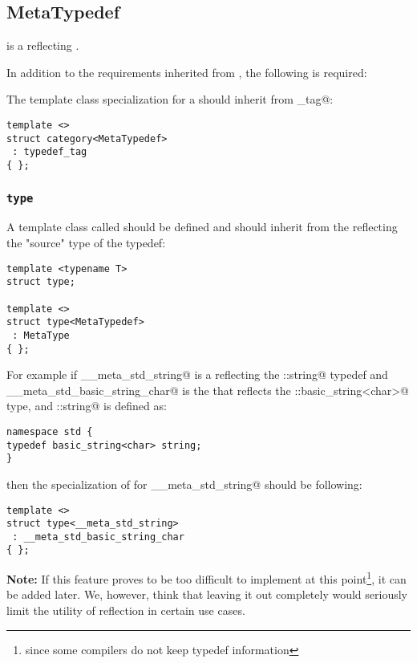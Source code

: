 \subsection{MetaTypedef}
\label{concept-MetaTypedef}

 is a  reflecting \verb@typedef@s.

In addition to the requirements inherited from , the following is required:

The \verb@category@ template class specialization for a  should
inherit from \verb@typedef_tag@:

\begin{verbatim}
template <>
struct category<MetaTypedef>
 : typedef_tag
{ };
\end{verbatim}

\subsubsection{\texttt{type}}

A template class called \verb@type@ should be defined and should inherit from the 
reflecting the "source" type of the typedef:

\begin{verbatim}
template <typename T>
struct type;

template <>
struct type<MetaTypedef>
 : MetaType
{ };
\end{verbatim}

For example if \verb@__meta_std_string@ is a  reflecting the \verb@std::string@
typedef and \verb@__meta_std_basic_string_char@ is the  that reflects
the \verb@std::basic_string<char>@ type, and \verb@std::string@ is defined as:

\begin{verbatim}
namespace std {
typedef basic_string<char> string;
}
\end{verbatim}

then the specialization of \verb@type@ for \verb@__meta_std_string@ should be following:

\begin{verbatim}
template <>
struct type<__meta_std_string>
 : __meta_std_basic_string_char
{ };
\end{verbatim}

\textbf{Note:} If this feature proves to be too difficult to implement 
at this point\footnote{since some compilers do not keep typedef information},
it can be added later. We, however, think that leaving it out completely would
seriously limit the utility of reflection in certain use cases.
